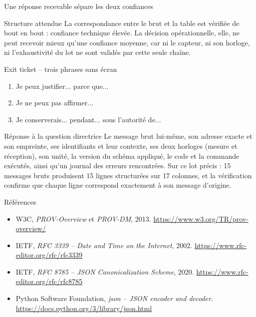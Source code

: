 \documentclass[aspectratio=169]{beamer}
\begin{document}
\begin{frame}{Une réponse recevable sépare les deux confiances}
\begin{block}{Structure attendue}
La correspondance entre le brut et la table est vérifiée de bout en bout : confiance technique élevée. La décision opérationnelle, elle, ne peut recevoir mieux qu'une confiance moyenne, car ni le capteur, ni son horloge, ni l'exhaustivité du lot ne sont validés par cette seule chaîne.
\end{block}
\end{frame}

\begin{frame}{Exit ticket -- trois phrases sans écran}
\begin{enumerate}
\item Je peux justifier... parce que...
\item Je ne peux pas affirmer...
\item Je conserverais... pendant... sous l'autorité de...
\end{enumerate}
\end{frame}

\begin{frame}{Réponse à la question directrice}
Le message brut lui-même, son adresse exacte et son empreinte, ses identifiants et leur contexte, ses deux horloges (mesure et réception), son unité, la version du schéma appliqué, le code et la commande exécutés, ainsi qu'un journal des erreurs rencontrées. Sur ce lot précis : 15 messages bruts produisent 15 lignes structurées sur 17 colonnes, et la vérification confirme que chaque ligne correspond exactement à son message d'origine.
\end{frame}

\begin{frame}{Références}
\small
\begin{itemize}
\item W3C, \emph{PROV-Overview} et \emph{PROV-DM}, 2013. \url{https://www.w3.org/TR/prov-overview/}
\item IETF, \emph{RFC 3339 -- Date and Time on the Internet}, 2002. \url{https://www.rfc-editor.org/rfc/rfc3339}
\item IETF, \emph{RFC 8785 -- JSON Canonicalization Scheme}, 2020. \url{https://www.rfc-editor.org/rfc/rfc8785}
\item Python Software Foundation, \emph{json -- JSON encoder and decoder}. \url{https://docs.python.org/3/library/json.html}
\end{itemize}
\end{frame}
\end{document}
